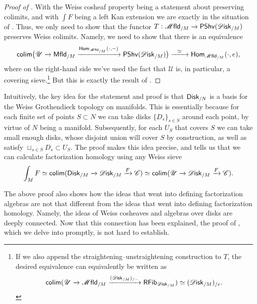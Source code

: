 \documentclass[../text.tex]{subfiles}
\begin{document}
\begin{proof}[Proof of {}]
    With the Weiss cosheaf property being a statement about preserving colimits, and with $\int F$ being a left Kan extension we are exactly in the situation of . Thus, we only need to show that the functor $T: \mfld_{/M} \xrightarrow{} \mathsf{PShv} (\disk_{/M})$ preserves Weiss colimits. Namely, we need to show that there is an equivalence
    \begin{equation}
        \mathsf{colim} \big( \mathscr{U} \xrightarrow{} \mfld[r]_{/M} \xrightarrow{\mathsf{Hom}_{\mfld_{/M}}(\cdot, -)} \mathsf{PShv} (\disk_{/M}) \big) \xrightarrow{\ \ \simeq \ \ } \mathsf{Hom}_{\mfld_{/M}}(\cdot, e),
    \end{equation}
    where on the right-hand side we've used the fact that $\mathscr{U}$ is, in particular, a covering sieve.\footnote{If we also append the straightening--unstraightening construction to $T$, the desired equivalence can equivalently be written as
    \begin{equation}
        \mathsf{colim} (\mathscr{U} \xrightarrow{} \mfld_{/M} \xrightarrow{ (\disk_{/M})_{/-}} \mathsf{RFib}_{\disk_{/M}}) \simeq (\disk_{/M})_{/e}.
    \end{equation}}
    But this is exactly the result of .
\end{proof}

\begin{remark}
    Intuitively, the key idea for the statement and proof is that $\disk[r]_{/N}$ is a basis for the Weiss Grothendieck topology on manifolds. This is essentially because for each finite set of points $S \subset N$ we can take disks $\{ D_s \}_{s \in S}$ around each point, by virtue of $N$ being a manifold. Subsequently, for each $U_S$ that covers $S$ we can take small enough disks, whose disjoint union will cover $S$ by construction, as well as satisfy $\sqcup_{s \in S} D_s \subset U_S$. The proof makes this idea precise, and tells us that we can calculate factorization homology using any Weiss sieve
    \begin{equation}
        \int_M F \simeq \mathsf{colim}(\disk[r]_{/M} \xrightarrow{} \disk_{/M} \xrightarrow{F} \catC)
        \simeq \mathsf{colim}(\mathscr{U} \xrightarrow{} \disk_{/M} \xrightarrow{F} \catC).
    \end{equation}
\end{remark}

The above proof also shows how the ideas that went into defining factorization algebras are not that different from the ideas that went into defining factorization homology. Namely, the ideas of Weiss cosheaves and algebras over disks are deeply connected. Now that this connection has been explained, the proof of , which we delve into promptly, is not hard to establish.
\end{document}
